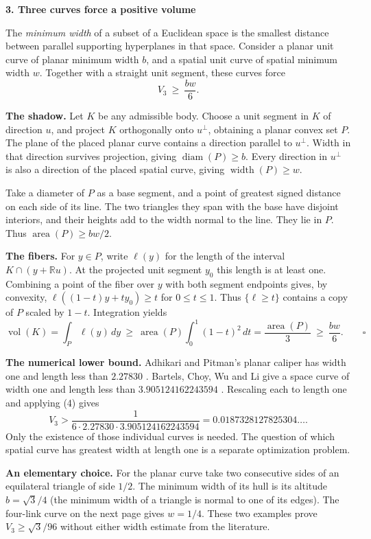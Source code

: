 \documentclass[11pt,letterpaper]{article}
\newcommand{\heading}[1]{{\large\sffamily\bfseries\color{ink}#1}\par\smallskip}
\newcommand{\term}[1]{\textbf{\color{ink}#1}}
\newcommand{\R}{\mathbb R}
\DeclareMathOperator{\area}{area}
\DeclareMathOperator{\vol}{vol}
\begin{document}
\newpage
\heading{3. Three curves force a positive volume}
The \emph{minimum width} of a subset of a Euclidean space is the smallest distance between parallel supporting hyperplanes in that space. Consider a planar unit curve of planar minimum width \(b\), and a spatial unit curve of spatial minimum width \(w\). Together with a straight unit segment, these curves force
\begin{equation}
                   V_3\ \ge\ \frac{bw}{6}.
\tag{4}
\end{equation}

\term{The shadow.} Let \(K\) be any admissible body. Choose a unit segment in \(K\) of direction \(u\), and project \(K\) orthogonally onto \(u^\perp\), obtaining a planar convex set \(P\). The plane of the placed planar curve contains a direction parallel to \(u^\perp\). Width in that direction survives projection, giving \(\operatorname{diam}(P)\ge b\). Every direction in \(u^\perp\) is also a direction of the placed spatial curve, giving \(\operatorname{width}(P)\ge w\).

Take a diameter of \(P\) as a base segment, and a point of greatest signed distance on each side of its line. The two triangles they span with the base have disjoint interiors, and their heights add to the width normal to the line. They lie in \(P\). Thus \(\area(P)\ge bw/2\).

\term{The fibers.} For \(y\in P\), write \(\ell(y)\) for the length of the interval \(K\cap(y+\R u)\). At the projected unit segment \(y_0\) this length is at least one. Combining a point of the fiber over \(y\) with both segment endpoints gives, by convexity, \(\ell((1-t)y+ty_0)\ge t\) for \(0\le t\le1\). Thus \(\{\ell\ge t\}\) contains a copy of \(P\) scaled by \(1-t\). Integration yields
\[
 \vol(K)=\int_P\ell(y)\,dy\ \ge\ \area(P)\int_0^1(1-t)^2\,dt
       =\frac{\area(P)}{3}\ \ge\ \frac{bw}{6}.\qquad\square
\]

\term{The numerical lower bound.} Adhikari and Pitman's planar caliper has width one and length less than \(2.27830\) \cite{caliper}. Bartels, Choy, Wu and Li give a space curve of width one and length less than \(3.905124162243594\) \cite[Theorem 1]{Bartels}. Rescaling each to length one and applying (4) gives
\[
 V_3>\frac{1}{6\cdot2.27830\cdot3.905124162243594}
      =0.0187328127825304\ldots .
\]
Only the existence of those individual curves is needed. The question of which spatial curve has greatest width at length one is a separate optimization problem.

\term{An elementary choice.} For the planar curve take two consecutive sides of an equilateral triangle of side \(1/2\). The minimum width of its hull is its altitude \(b=\sqrt3/4\) (the minimum width of a triangle is normal to one of its edges). The four-link curve on the next page gives \(w=1/4\). These two examples prove \(V_3\ge\sqrt3/96\) without either width estimate from the literature.
\end{document}
